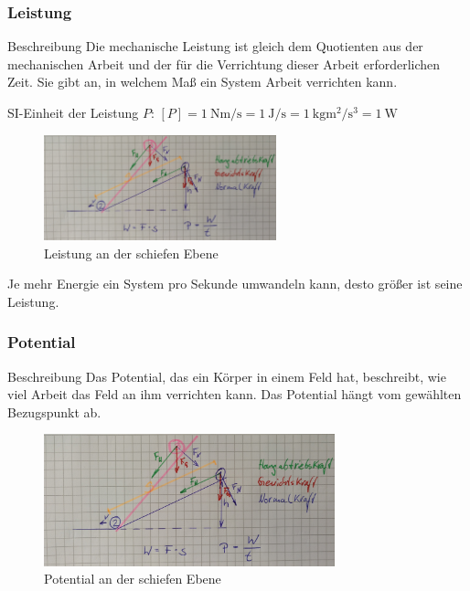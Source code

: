 \documentclass{article}
\begin{document}
\frame
{
  \frametitle{Leistung}
\begin{block}{Beschreibung}
Die mechanische Leistung ist gleich dem Quotienten aus der mechanischen Arbeit und der für die Verrichtung dieser Arbeit erforderlichen Zeit. Sie gibt an, in welchem Maß ein System Arbeit verrichten kann.
\end{block}
SI-Einheit der Leistung $P$:
$[P]=\SI{1}{\newton\meter\per\second}=\SI{1}{\joule\per\second}=\SI{1}{\kilo\gram\square\meter\per\cubic\second}=\SI{1}{\watt}$
      \begin{figure}
	  \includegraphics[width=0.6\textwidth]{Leistung}
	  \vspace{-3mm}
	  \caption{Leistung an der schiefen Ebene}
   \end{figure}
   Je mehr Energie ein System pro Sekunde umwandeln kann, desto größer ist seine Leistung.
}

\frame
{
  \frametitle{Potential}
\begin{block}{Beschreibung}
Das Potential, das ein Körper in einem Feld hat, beschreibt, wie viel Arbeit das Feld an ihm verrichten kann. Das Potential hängt vom gewählten Bezugspunkt ab.
\end{block}
      \begin{figure}
	  \includegraphics[width=0.75\textwidth]{Leistung}
	  \vspace{-3mm}
	  \caption{Potential an der schiefen Ebene}
   \end{figure}
}
\end{document}
